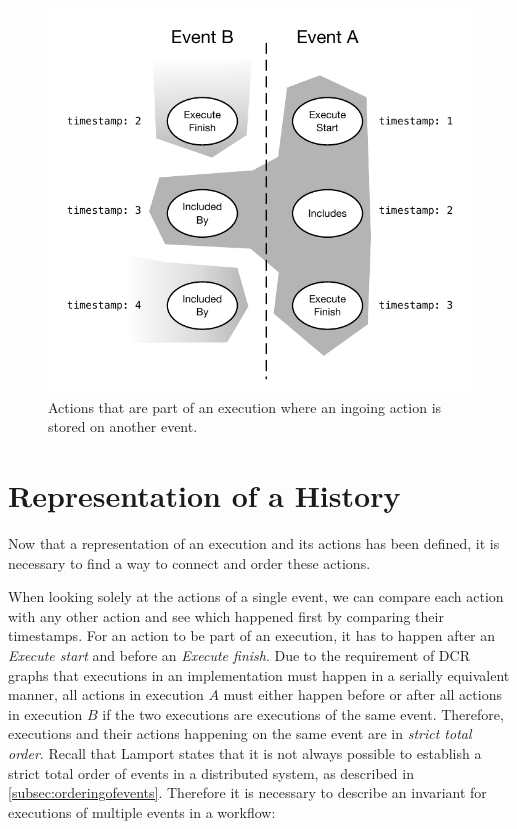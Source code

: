     \begin{figure}[H]
		\centering
		\includegraphics[height=0.35\textheight]{3local/images/execution.pdf}
		\caption{Actions that are part of an execution where an ingoing action is stored on another event.}
		\label{fig:representing:execution}
	\end{figure}

    \section{Representation of a History}\label{sec:rep:hist}
	Now that a representation of an execution and its actions has been defined, it is necessary to find a way to connect and order these actions.
    
    \newpar When looking solely at the actions of a single event, we can compare each action with any other action and see which happened first by comparing their timestamps. For an action to be part of an execution, it has to happen after an \textit{Execute start} and before an \textit{Execute finish}. Due to the requirement of DCR graphs that executions in an implementation must happen in a serially equivalent manner, all actions in execution $A$ must either happen before or after all actions in execution $B$ if the two executions are executions of the same event. Therefore, executions and their actions happening on the same event are in  \textit{strict total order}. Recall that Lamport states that it is not always possible to establish a strict total order of events in a distributed system, as described in \autoref{subsec:orderingofevents}. Therefore it is necessary to describe an invariant for executions of multiple events in a workflow:
	
